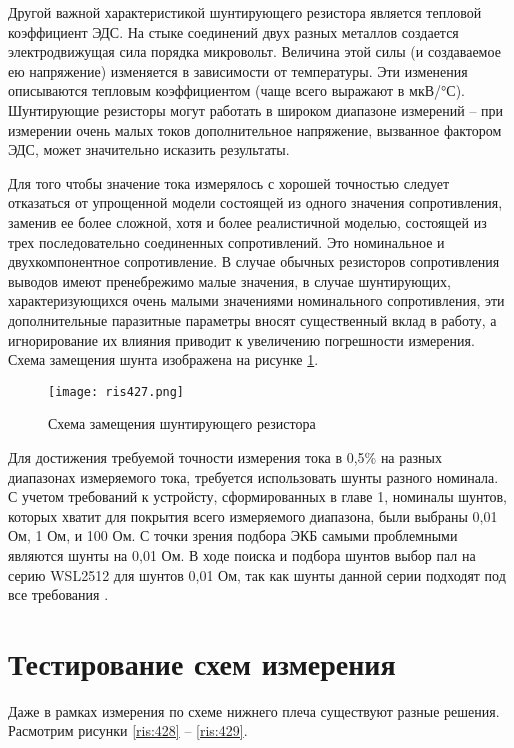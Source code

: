 Другой важной характеристикой шунтирующего резистора является тепловой коэффициент ЭДС. На стыке 
соединений двух разных металлов создается электродвижущая сила порядка микровольт. Величина этой 
силы (и создаваемое ею напряжение) изменяется в зависимости от температуры. Эти изменения описываются 
тепловым коэффициентом (чаще всего выражают в мкВ/°С). Шунтирующие резисторы могут работать в широком 
диапазоне измерений -- при измерении очень малых токов дополнительное напряжение, вызванное фактором 
ЭДС, может значительно исказить результаты.

Для того чтобы значение тока измерялось с хорошей точностью следует отказаться от упрощенной модели 
состоящей из одного значения сопротивления, заменив ее более сложной, хотя и более реалистичной моделью, 
состоящей из трех последовательно соединенных сопротивлений. Это номинальное и двухкомпонентное 
сопротивление. В случае обычных резисторов сопротивления выводов имеют пренебрежимо малые значения, 
в случае шунтирующих, характеризующихся очень малыми значениями номинального сопротивления, 
эти дополнительные паразитные параметры вносят существенный вклад в работу, а игнорирование их 
влияния приводит к увеличению погрешности измерения. Схема замещения шунта изображена на рисунке 
\ref{ris:427}.

\begin{figure}[H]
\centering
\texttt{[image: ris427.png]}
\caption{Схема замещения шунтирующего резистора}
\label{ris:427}
\end{figure}

Для достижения требуемой точности измерения тока в 0,5\% на разных диапазонах измеряемого тока, 
требуется использовать шунты разного номинала. С учетом требований к устройсту, сформированных в главе 1,
номиналы шунтов, которых хватит для покрытия всего измеряемого диапазона, были выбраны 
0,01 Ом, 1 Ом, и 100 Ом. С точки зрения подбора ЭКБ самыми проблемными являются шунты на 0,01 Ом. 
В ходе поиска и подбора шунтов выбор пал на серию WSL2512 для шунтов 0,01 Ом, так как шунты данной серии
подходят под все требования \cite{GooglePatent:1}. 

\section{Тестирование схем измерения}
\hspace{1cm}

Даже в рамках измерения по схеме нижнего плеча существуют разные решения. Расмотрим рисунки \ref{ris:428} --
\ref{ris:429}.

